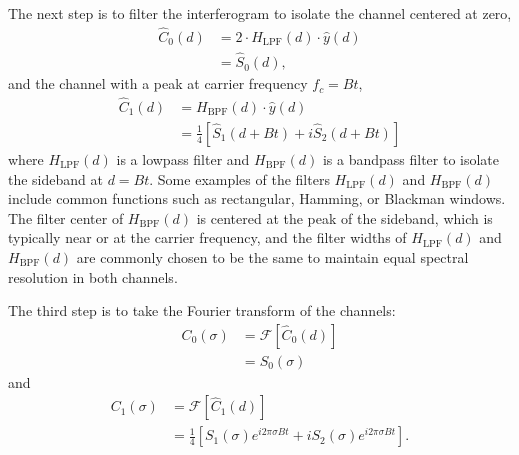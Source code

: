 \documentclass[10pt]{article}
\numberwithin{equation}{subsection}
\begin{document}
The next step is to filter the interferogram to isolate the channel centered at zero,
\begin{equation}
    \begin{split}
        \widehat{C}_0(d) &= 2 \cdot H_{\text{LPF}}(d) \cdot \widehat{y}(d) \\
        &= \widehat{S}_0(d),
    \end{split}
    \label{eqn:frC0}
\end{equation}
and the channel with a peak at carrier frequency $f_c = Bt$,
\begin{equation}
    \begin{split}
        \widehat{C}_1(d) &= H_{\text{BPF}}(d) \cdot \widehat{y}(d) \\
        &= \frac{1}{4} \left[\widehat{S}_1(d + Bt) + i\widehat{S}_2(d + Bt)\right]
    \end{split}
    \label{eqn:frC1}
\end{equation}
%
where $H_{\text{LPF}}(d)$ is a lowpass filter and $H_{\text{BPF}}(d)$ is a bandpass filter to isolate the sideband at $d = Bt$.
Some examples of the filters $H_{\text{LPF}}(d)$ and $H_{\text{BPF}}(d)$ include common functions such as rectangular, Hamming, or Blackman windows.
The filter center of $H_{\text{BPF}}(d)$ is centered at the peak of the sideband, which is typically near or at the carrier frequency, and the filter widths of $H_{\text{LPF}}(d)$ and $H_{\text{BPF}}(d)$ are commonly chosen to be the same to maintain equal spectral resolution in both channels.

The third step is to take the Fourier transform of the channels:
\begin{equation}
    \begin{split}
        C_0(\sigma) &= \mathcal F \left[ \widehat{C}_0(d) \right] \\
        &= S_0(\sigma)
    \end{split}
    \label{eqn:c0s0}
\end{equation}
and
\begin{equation}
    \begin{split}
    C_1(\sigma) &= \mathcal F \left[ \widehat{C}_1(d) \right] \\
        &= \frac{1}{4} \left[ S_1(\sigma) e^{i2\pi \sigma B t} + i S_2(\sigma) e^{i 2\pi \sigma B t} \right].
    \end{split}
    \label{eqn:c1}
\end{equation}
%
\end{document}
